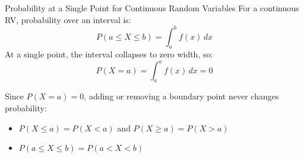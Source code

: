 \documentclass[12pt, aspectratio=169]{beamer}
\begin{document}








	\begin{frame}{Probability at a Single Point for Continuous Random Variables}
		For a continuous RV, probability over an interval is:
		\[
			P(a \leqslant X \leqslant b) = \int_a^b f(x)\,dx
		\]
		At a single point, the interval collapses to zero width, so:
		\[
			P(X = a) = \int_a^a f(x)\,dx = 0
		\]

		\vspace{0.5em}

		Since $P(X = a) = 0$, adding or removing a boundary point never changes probability:
		\begin{itemize}
			\item $P(X \leqslant a) = P(X < a)$ \quad and \quad $P(X \geqslant a) = P(X > a)$
			\item $P(a \leqslant X \leqslant b) = P(a < X < b)$
		\end{itemize}
	\end{frame}
\end{document}
